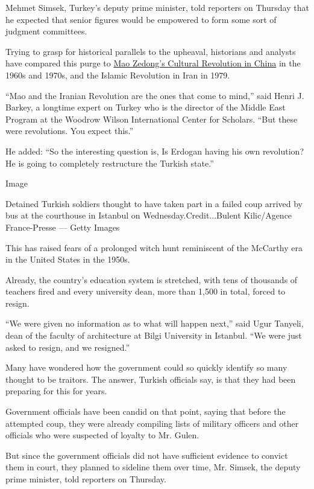 Mehmet Simsek, Turkey's deputy prime minister, told reporters on
Thursday that he expected that senior figures would be empowered to form
some sort of judgment committees.

Trying to grasp for historical parallels to the upheaval, historians and
analysts have compared this purge to
\href{http://www.nytimes3xbfgragh.onion/2016/05/15/world/asia/china-cultural-revolution-explainer.html}{Mao
Zedong's Cultural Revolution in China} in the 1960s and 1970s, and the
Islamic Revolution in Iran in 1979.

``Mao and the Iranian Revolution are the ones that come to mind,'' said
Henri J. Barkey, a longtime expert on Turkey who is the director of the
Middle East Program at the Woodrow Wilson International Center for
Scholars. ``But these were revolutions. You expect this.''

He added: ``So the interesting question is, Is Erdogan having his own
revolution? He is going to completely restructure the Turkish state.''

Image

Detained Turkish soldiers thought to have taken part in a failed coup
arrived by bus at the courthouse in Istanbul on
Wednesday.Credit...Bulent Kilic/Agence France-Presse --- Getty Images

This has raised fears of a prolonged witch hunt reminiscent of the
McCarthy era in the United States in the 1950s.

Already, the country's education system is stretched, with tens of
thousands of teachers fired and every university dean, more than 1,500
in total, forced to resign.

``We were given no information as to what will happen next,'' said Ugur
Tanyeli, dean of the faculty of architecture at Bilgi University in
Istanbul. ``We were just asked to resign, and we resigned.''

Many have wondered how the government could so quickly identify so many
thought to be traitors. The answer, Turkish officials say, is that they
had been preparing for this for years.

Government officials have been candid on that point, saying that before
the attempted coup, they were already compiling lists of military
officers and other officials who were suspected of loyalty to Mr. Gulen.

But since the government officials did not have sufficient evidence to
convict them in court, they planned to sideline them over time, Mr.
Simsek, the deputy prime minister, told reporters on Thursday.

